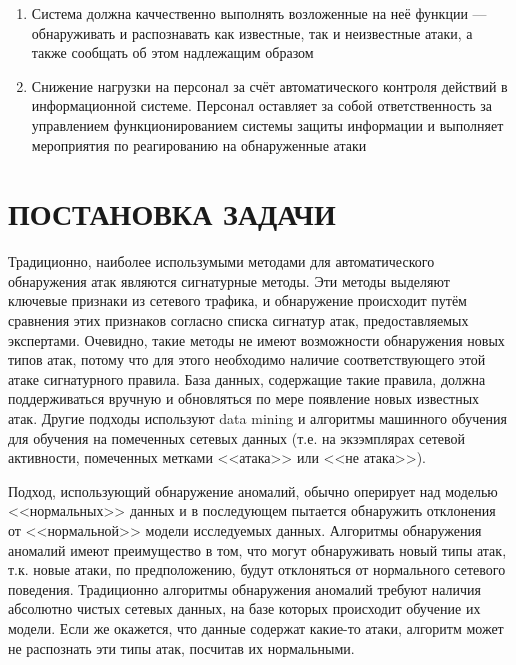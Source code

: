 \begin{enumerate}

\item Система должна каччественно выполнять возложенные на неё функции --- обнаруживать и распознавать как известные, так и неизвестные атаки, а также сообщать об этом надлежащим образом

\item Снижение нагрузки на персонал за счёт автоматического контроля действий в информационной системе. Персонал оставляет за собой ответственность за управлением функционированием системы защиты информации и выполняет мероприятия по реагированию на обнаруженные атаки

\end{enumerate}


\section{ПОСТАНОВКА ЗАДАЧИ}

Традиционно, наиболее использумыми методами для автоматического обнаружения атак являются сигнатурные методы. Эти методы выделяют ключевые признаки из сетевого трафика, и обнаружение происходит путём сравнения этих признаков согласно списка сигнатур атак, предоставляемых экспертами. Очевидно, такие методы не имеют возможности обнаружения новых типов атак, потому что для этого необходимо наличие соответствующего этой атаке сигнатурного правила. База данных, содержащие такие правила, должна поддерживаться вручную и обновляться по мере появление новых известных атак. Другие подходы используют data mining и алгоритмы машинного обучения для обучения на помеченных сетевых данных (т.е. на экзэмплярах сетевой активности, помеченных метками <<атака>> или <<не атака>>).

Подход, использующий обнаружение аномалий, обычно оперирует над моделью <<нормальных>> данных и в последующем пытается обнаружить отклонения от <<нормальной>> модели исследуемых данных. Алгоритмы обнаружения аномалий имеют преимущество в том, что могут обнаруживать новый типы атак, т.к. новые атаки, по предположению, будут отклоняться от нормального сетевого поведения. Традиционно алгоритмы обнаружения аномалий требуют наличия абсолютно чистых сетевых данных, на базе которых происходит обучение их модели. Если же окажется, что данные содержат какие-то атаки, алгоритм может не распознать эти типы атак, посчитав их нормальными.

